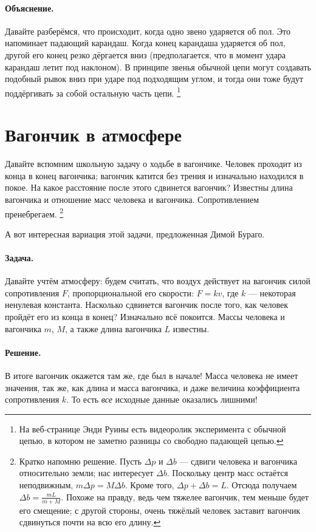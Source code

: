 \paragraph{Объяснение.}
Давайте разберёмся, что происходит, когда одно звено ударяется об пол.
Это напоминает падающий карандаш.
Когда конец карандаша ударяется об пол, другой его конец резко дёргается вниз (предполагается, что в момент удара карандаш летит под наклоном).
В принципе звенья обычной цепи могут создавать подобный рывок вниз при ударе под подходящим углом, и тогда они тоже будут поддёргивать за собой остальную часть цепи.%
\footnote{На веб-странице Энди Руины \cite{ruina2011fallingchains} есть видеоролик эксперимента с обычной цепью, в котором не заметно разницы со свободно падающей цепью. \pr}

\section{Вагончик в атмосфере}

Давайте вспомним школьную задачу о ходьбе в вагончике.
Человек проходит из конца в конец вагончика;
вагончик катится без трения и изначально находился в покое.
На какое расстояние после этого сдвинется вагончик?
Известны длина вагончика и отношение масс человека и вагончика.
Сопротивлением пренебрегаем.%
\footnote{Кратко напомню решение.
Пусть $\Delta p$ и $\Delta b$ --- сдвиги человека и вагончика относительно земли;
нас интересует $\Delta b$.
Поскольку центр масс остаётся неподвижным, $m\Delta p=M\Delta b$.
Кроме того,
$\Delta p+\Delta b=L$.
Отсюда получаем $\Delta b=\tfrac{m L}{m+M}$.
Похоже на правду, ведь чем тяжелее вагончик, тем меньше будет его смещение;
с другой стороны, очень тяжёлый человек заставит вагончик сдвинуться почти на всю его длину.}

А вот интересная вариация этой задачи, предложенная Димой Бураго.

\paragraph{Задача.}
Давайте учтём атмосферу: будем считать, что воздух действует на вагончик силой сопротивления $F$,
пропорциональной его скорости: $F=kv$, где $k$ --- некоторая ненулевая константа.
Насколько сдвинется вагончик после того, как человек пройдёт его из конца в конец?
Изначально всё покоится.
Массы человека и вагончика $m$, $M$, а также длина вагончика $L$ известны.

\paragraph{Решение.}
В итоге вагончик окажется там же, где был в начале!
Масса человека не имеет значения, так же, как длина и масса вагончика, и даже величина коэффициента сопротивления $k$.
То есть \emph{все} исходные данные оказались лишними!

